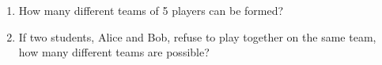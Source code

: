 

\begin{enumerate}
  \item How many different teams of 5 players can be formed?
  \item If two students, Alice and Bob, refuse to play together on the same team, how many different teams are possible?
\end{enumerate}
